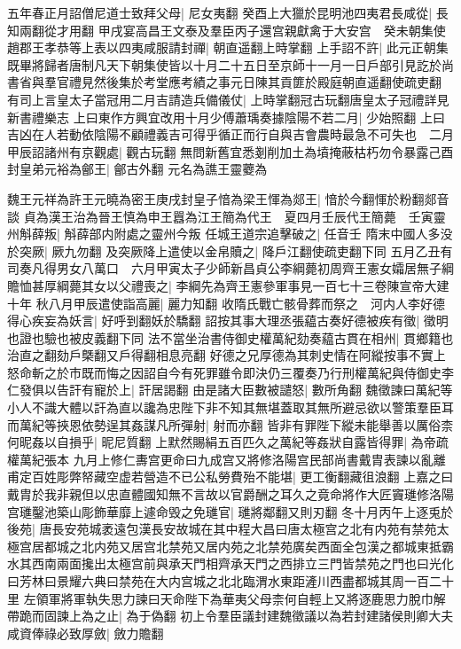 五年春正月詔僧尼道士致拜父母|{
	尼女夷翻}
癸酉上大獵於昆明池四夷君長咸從|{
	長知兩翻從才用翻}
甲戌宴高昌王文泰及羣臣丙子還宫親獻禽于大安宫　癸未朝集使趙郡王孝恭等上表以四夷咸服請封禪|{
	朝直遥翻上時掌翻}
上手詔不許|{
	此元正朝集既畢將歸者唐制凡天下朝集使皆以十月二十五日至京師十一月一日戶部引見訖於尚書省與羣官禮見然後集於考堂應考績之事元日陳其貢篚於殿庭朝直遥翻使疏吏翻}
有司上言皇太子當冠用二月吉請造兵備儀仗|{
	上時掌翻冠古玩翻唐皇太子冠禮詳見新書禮樂志}
上曰東作方興宜改用十月少傅蕭瑀奏據陰陽不若二月|{
	少始照翻}
上曰吉凶在人若動依陰陽不顧禮義吉可得乎循正而行自與吉會農時最急不可失也　二月甲辰詔諸州有京觀處|{
	觀古玩翻}
無問新舊宜悉剗削加土為墳掩蔽枯朽勿令暴露己酉封皇弟元裕為鄶王|{
	鄶古外翻}
元名為譙王靈蘷為

魏王元祥為許王元曉為密王庚戌封皇子愔為梁王惲為郯王|{
	愔於今翻惲於粉翻郯音談}
貞為漢王治為晉王慎為申王囂為江王簡為代王　夏四月壬辰代王簡薨　壬寅靈州斛薛叛|{
	斛薛部内附處之靈州今叛}
任城王道宗追擊破之|{
	任音壬}
隋末中國人多没於突厥|{
	厥九勿翻}
及突厥降上遣使以金帛贖之|{
	降戶江翻使疏吏翻下同}
五月乙丑有司奏凡得男女八萬口　六月甲寅太子少師新昌貞公李綱薨初周齊王憲女孀居無子綱贍恤甚厚綱薨其女以父禮喪之|{
	李綱先為齊王憲參軍事見一百七十三卷陳宣帝大建十年}
秋八月甲辰遣使詣高麗|{
	麗力知翻}
收隋氏戰亡骸骨葬而祭之　河内人李好德得心疾妄為妖言|{
	好呼到翻妖於驕翻}
詔按其事大理丞張藴古奏好德被疾有徵|{
	徵明也證也驗也被皮義翻下同}
法不當坐治書侍御史權萬紀劾奏藴古貫在相州|{
	貫鄉籍也治直之翻劾戶槩翻又戶得翻相息亮翻}
好德之兄厚德為其刺史情在阿縱按事不實上怒命斬之於市既而悔之因詔自今有死罪雖令即決仍三覆奏乃行刑權萬紀與侍御史李仁發俱以告訐有寵於上|{
	訐居謁翻}
由是諸大臣數被譴怒|{
	數所角翻}
魏徵諫曰萬紀等小人不識大體以訐為直以讒為忠陛下非不知其無堪蓋取其無所避忌欲以警策羣臣耳而萬紀等挾恩依勢逞其姦謀凡所彈射|{
	射而亦翻}
皆非有罪陛下縱未能舉善以厲俗柰何昵姦以自損乎|{
	昵尼質翻}
上默然賜絹五百匹久之萬紀等姦狀自露皆得罪|{
	為帝疏權萬紀張本}
九月上修仁夀宫更命曰九成宫又將修洛陽宫民部尚書戴胄表諫以亂離甫定百姓彫弊帑藏空虚若營造不已公私勞費殆不能堪|{
	更工衡翻藏徂浪翻}
上嘉之曰戴胄於我非親但以忠直體國知無不言故以官爵酬之耳久之竟命將作大匠竇璡修洛陽宫璡鑿池築山彫飾華靡上遽命毁之免璡官|{
	璡將鄰翻又則刃翻}
冬十月丙午上逐兎於後苑|{
	唐長安苑城袤遠包漢長安故城在其中程大昌曰唐太極宫之北有内苑有禁苑太極宫居都城之北内苑又居宫北禁苑又居内苑之北禁苑廣矣西面全包漢之都城東抵霸水其西南兩面攙出太極宫前與承天門相齊承天門之西排立三門皆禁苑之門也曰光化曰芳林曰景耀六典曰禁苑在大内宫城之北北臨渭水東距滻川西盡都城其周一百二十里}
左領軍將軍執失思力諫曰天命陛下為華夷父母柰何自輕上又將逐鹿思力脫巾解帶跪而固諫上為之止|{
	為于偽翻}
初上令羣臣議封建魏徵議以為若封建諸侯則卿大夫咸資俸祿必致厚斂|{
	斂力贍翻}
